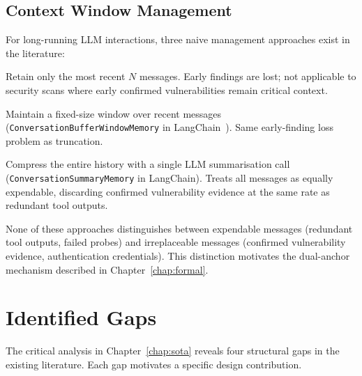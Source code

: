 \documentclass[12pt, a4paper, oneside, openany]{book}
\newcommand{\code}[1]{\texttt{#1}}
\begin{document}
\section{Context Window Management}
\label{sec:context}

For long-running LLM interactions, three naive management approaches
exist in the literature:

\begin{description}[leftmargin=1.5em, font=\bfseries]
  \item[Truncation:] Retain only the most recent $N$ messages.  Early
    findings are lost; not applicable to security scans where early
    confirmed vulnerabilities remain critical context.

  \item[Sliding window:] Maintain a fixed-size window over recent
    messages (\code{ConversationBufferWindowMemory} in
    LangChain~\cite{langchain2023}).  Same early-finding loss
    problem as truncation.

  \item[Uniform summarisation:] Compress the entire history with a
    single LLM summarisation call (\code{ConversationSummaryMemory}
    in LangChain).  Treats all messages as equally expendable,
    discarding confirmed vulnerability evidence at the same rate
    as redundant tool outputs.
\end{description}

None of these approaches distinguishes between expendable messages
(redundant tool outputs, failed probes) and irreplaceable messages
(confirmed vulnerability evidence, authentication credentials).
This distinction motivates the dual-anchor mechanism described in
Chapter~\ref{chap:formal}.

\chapter{Identified Gaps}
\label{chap:gaps}

The critical analysis in Chapter~\ref{chap:sota} reveals four
structural gaps in the existing literature.  Each gap motivates a
specific design contribution.
\end{document}
